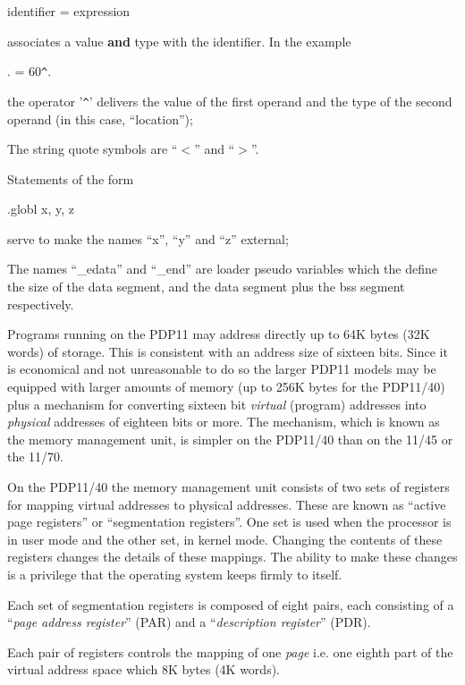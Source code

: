 \bc
identifier = expression
\ec

associates a value {\bf and} type with
the identifier. In the example

\bc
. = 60\verb+^+.
\ec

the operator '\verb+^+' delivers the
value of the first operand and
the type of the second operand
(in this case, ``location'');

\item[(j)] The string quote symbols
are ``$<$'' and ``$>$''.

\item[(k)] Statements of the form

\bc
.globl x, y, z
\ec

serve to make the names ``x'', ``y''
and ``z'' external;

\item[(l)] The names ``\_edata'' and ``\_end''
are loader pseudo variables
which the define the size of the
data segment, and the data segment
plus the bss segment
respectively.
\ed



Programs running on the PDP11 may
address directly up to 64K bytes (32K
words) of storage. This is consistent
with an address size of sixteen bits.
Since it is economical and not unreasonable
to do so the larger PDP11
models may be equipped with larger
amounts of memory (up to 256K bytes for
the PDP11/40) plus a mechanism for
converting sixteen bit {\it virtual} (program)
addresses into {\it physical} addresses of
eighteen bits or more. The mechanism,
which is known as the memory management
unit, is simpler on the PDP11/40 than
on the 11/45 or the 11/70.

On the PDP11/40 the memory management
unit consists of two sets of registers
for mapping virtual addresses to physical
addresses. These are known as
``active page registers'' or ``segmentation
registers''. One set is used when
the processor is in user mode and the
other set, in kernel mode. Changing the
contents of these registers changes the
details of these mappings. The ability
to make these changes is a privilege
that the operating system keeps firmly
to itself.


Each set of segmentation registers is
composed of eight pairs, each consisting
of a ``{\it page address register}'' (PAR)
and a ``{\it description register}''
(PDR).

Each pair of registers controls the
mapping of one {\it page} i.e. one eighth
part of the virtual address space which
8K bytes (4K words).


